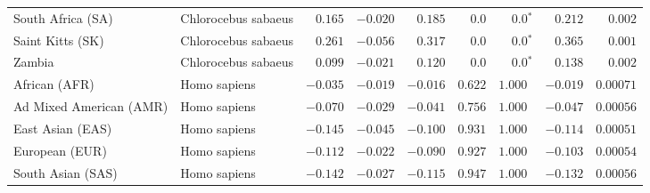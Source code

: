 \begin{center}
\begin{adjustbox}{width = 1\textwidth}
\begin{tabular}{|l|l|r|r|r|r|r|r|r|}
              South Africa (SA) &  Chlorocebus sabaeus &                                        $ 0.165$ &                                           $-0.020$ &                      $ 0.185$ &            $0.0$ &                  $\bm{0.0{^*}}$ &                                           $ 0.212$ &           $ 0.002$ \\
               Saint Kitts (SK) &  Chlorocebus sabaeus &                                        $ 0.261$ &                                           $-0.056$ &                      $ 0.317$ &            $0.0$ &                  $\bm{0.0{^*}}$ &                                           $ 0.365$ &           $ 0.001$ \\
                         Zambia &  Chlorocebus sabaeus &                                        $ 0.099$ &                                           $-0.021$ &                      $ 0.120$ &            $0.0$ &                  $\bm{0.0{^*}}$ &                                           $ 0.138$ &           $ 0.002$ \\
                  African (AFR) &         Homo sapiens &                                        $-0.035$ &                                           $-0.019$ &                      $-0.016$ &         $ 0.622$ &                      $ 1.000~~$ &                                           $-0.019$ &          $0.00071$ \\
        Ad Mixed American (AMR) &         Homo sapiens &                                        $-0.070$ &                                           $-0.029$ &                      $-0.041$ &         $ 0.756$ &                      $ 1.000~~$ &                                           $-0.047$ &          $0.00056$ \\
               East Asian (EAS) &         Homo sapiens &                                        $-0.145$ &                                           $-0.045$ &                      $-0.100$ &         $ 0.931$ &                      $ 1.000~~$ &                                           $-0.114$ &          $0.00051$ \\
                 European (EUR) &         Homo sapiens &                                        $-0.112$ &                                           $-0.022$ &                      $-0.090$ &         $ 0.927$ &                      $ 1.000~~$ &                                           $-0.103$ &          $0.00054$ \\
              South Asian (SAS) &         Homo sapiens &                                        $-0.142$ &                                           $-0.027$ &                      $-0.115$ &         $ 0.947$ &                      $ 1.000~~$ &                                           $-0.132$ &          $0.00056$ \\

\end{tabular}
\end{adjustbox}
\end{center}
